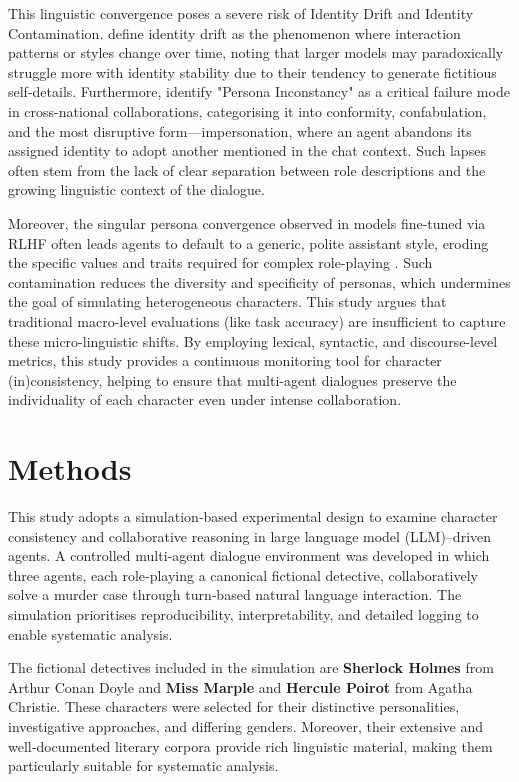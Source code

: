 \documentclass{article}
\begin{document}
This linguistic convergence poses a severe risk of Identity Drift and Identity Contamination. \cite{choi2024examining} define identity drift as the phenomenon where interaction patterns or styles change over time, noting that larger models may paradoxically struggle more with identity stability due to their tendency to generate fictitious self-details. Furthermore, \cite{baltaji2024cultured} identify "Persona Inconstancy" as a critical failure mode in cross-national collaborations, categorising it into conformity, confabulation, and the most disruptive form—impersonation, where an agent abandons its assigned identity to adopt another mentioned in the chat context. Such lapses often stem from the lack of clear separation between role descriptions and the growing linguistic context of the dialogue.

Moreover, the singular persona convergence observed in models fine-tuned via RLHF often leads agents to default to a generic, polite assistant style, eroding the specific values and traits required for complex role-playing \citep{park2023generative, moon2024anthology}. Such contamination reduces the diversity and specificity of personas, which undermines the goal of simulating heterogeneous characters. This study argues that traditional macro-level evaluations (like task accuracy) are insufficient to capture these micro-linguistic shifts. By employing lexical, syntactic, and discourse-level metrics, this study provides a continuous monitoring tool for character (in)consistency, helping to ensure that multi-agent dialogues preserve the individuality of each character even under intense collaboration.

\section{Methods}

This study adopts a simulation‑based experimental design to examine character consistency and collaborative reasoning in large language model (LLM)–driven agents. A controlled multi‑agent dialogue environment was developed in which three agents, each role‑playing a canonical fictional detective, collaboratively solve a murder case through turn‑based natural language interaction. The simulation prioritises reproducibility, interpretability, and detailed logging to enable systematic analysis.

The fictional detectives included in the simulation are \textbf{Sherlock Holmes} from Arthur Conan Doyle and \textbf{Miss Marple} and \textbf{Hercule Poirot} from Agatha Christie. These characters were selected for their distinctive personalities, investigative approaches, and differing genders. Moreover, their extensive and well‑documented literary corpora provide rich linguistic material, making them particularly suitable for systematic analysis.
\end{document}
